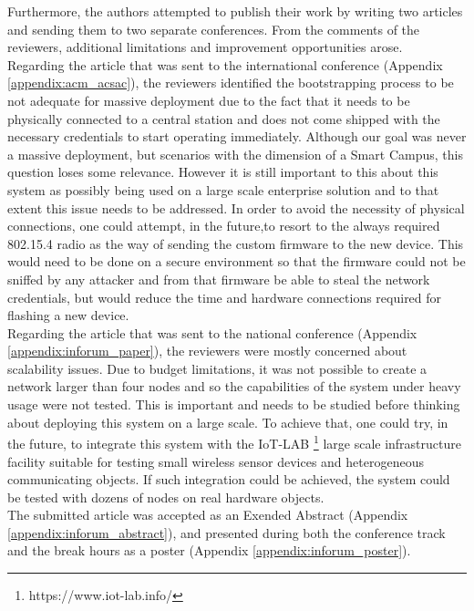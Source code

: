 Furthermore, the authors attempted to publish their work by writing two articles and sending them to two separate conferences. From the comments of the reviewers, additional limitations and improvement opportunities arose.\\
Regarding the article that was sent to the international conference (Appendix  \ref{appendix:acm_acsac}), the reviewers identified the bootstrapping process to be not adequate for massive deployment due to the fact that it needs to be physically connected to a central station and does not come shipped with the necessary credentials to start operating immediately. Although our goal was never a massive deployment, but scenarios with the dimension of a Smart Campus, this question loses some relevance. However it is still important to this about this system as possibly being used on a large scale enterprise solution and to that extent this issue needs to be addressed. In order to avoid the necessity of physical connections, one could attempt, in the future,to resort to the always required 802.15.4 radio as the way of sending the custom firmware to the new device. This would need to be done on a secure environment so that the firmware could not be sniffed by any attacker and from that firmware be able to steal the network credentials, but would reduce the time and hardware connections required for flashing a new device.\\
Regarding the article that was sent to the national conference (Appendix \ref{appendix:inforum_paper}), the reviewers were mostly concerned about scalability issues. Due to budget limitations, it was not possible to create a network larger than four nodes and so the capabilities of the system under heavy usage were not tested. This is important and needs to be studied before thinking about deploying this system on a large scale. To achieve that, one could try, in the future, to integrate this system with the IoT-LAB \footnote{https://www.iot-lab.info/} large scale infrastructure facility suitable for testing small wireless sensor devices and heterogeneous communicating objects. If such integration could be achieved, the system could be tested with dozens of nodes on real hardware objects.\\
The submitted article was accepted as an Exended Abstract (Appendix \ref{appendix:inforum_abstract}), and presented during both the conference track and the break hours as a poster (Appendix \ref{appendix:inforum_poster}).

